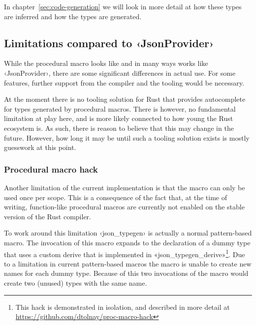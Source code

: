 In chapter~\ref{sec:code-generation} we will look in more detail at how these types are inferred and how the types are generated.

\subsection{Limitations compared to ‹JsonProvider›}
\label{sec:macro-limitations}

While the procedural macro looks like and in many ways works like ‹JsonProvider›, there are some significant differences in actual use. For some features, further support from the compiler and the tooling would be necessary.

At the moment there is no tooling solution for Rust that provides autocomplete for types generated by procedural macros. There is however, no fundamental limitation at play here, and is more likely connected to how young the Rust ecosystem is. As such, there is reason to believe that this may change in the future. However, how long it may be until such a tooling solution exists is mostly guesswork at this point.


\subsubsection{Procedural macro hack}

Another limitation of the current implementation is that the macro can only be used once per scope. This is a consequence of the fact that, at the time of writing, function-like procedural macros are currently not enabled on the stable version of the Rust compiler.

To work around this limitation ‹json_typegen› is actually a normal pattern-based macro. The invocation of this macro expands to the declaration of a dummy type that uses a custom derive that is implemented in «json_typegen_derive»\footnote{This hack is demonstrated in isolation, and described in more detail at \url{https://github.com/dtolnay/proc-macro-hack}}. Due to a limitation in current pattern-based macros the macro is unable to create new names for each dummy type. Because of this two invocations of the macro would create two (unused) types with the same name.


